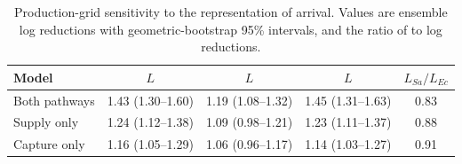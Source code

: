 \begin{table}[htbp]\centering\small
\caption{Production-grid sensitivity to the representation of arrival. Values are ensemble log reductions with geometric-bootstrap 95\% intervals, and the ratio of \Sa{} to \Ec{} log reductions.}
\label{tab:structural}
\begin{tabular}{lcccc}\toprule
Model & \Ec{} $L$ & \Sa{} $L$ & \Pa{} $L$ & $L_{Sa}/L_{Ec}$\\\midrule
Both pathways & 1.43 (1.30--1.60) & 1.19 (1.08--1.32) & 1.45 (1.31--1.63) & 0.83\\
Supply only & 1.24 (1.12--1.38) & 1.09 (0.98--1.21) & 1.23 (1.11--1.37) & 0.88\\
Capture only & 1.16 (1.05--1.29) & 1.06 (0.96--1.17) & 1.14 (1.03--1.27) & 0.91\\
\bottomrule\end{tabular}
\end{table}
